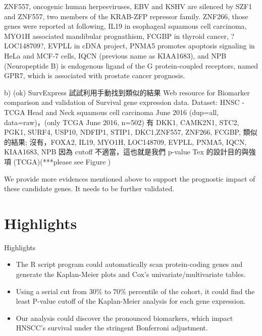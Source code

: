\documentclass[preprint,12pt]{elsarticle}
\begin{document}
ZNF557, oncogenic human herpesviruses, EBV and KSHV are silenced by SZF1 and ZNF557, two members of the KRAB-ZFP repressor family\cite{Li2018c}.
ZNF266, %
those genes were reported at following, 
IL19 in esophageal squamous cell carcinoma\cite{Hsing2013},
MYO1H associated mandibular prognathism\cite{Sun2018}, 
FCGBP in thyroid cancer\cite{Griffith2006}, 
?LOC148709?, 
EVPLL in cDNA project,
PNMA5 promotes apoptosis signaling in HeLa and MCF-7 cells\cite{Lee2016}, 
IQCN (previous name as KIAA1683), and 
NPB (Neuropeptide B) is endogenous ligand of the G protein-coupled receptors, named GPR7\cite{Andreis2005}, which is associated with prostate cancer prognosis\cite{Cottrell2007}. 



b) (ok) SurvExpress
試試利用手動找到類似的結果 Web resource for Biomarker comparison and validation of Survival gene expression data. 
Dataset: HNSC - TCGA Head and Neck squamous cell carcinoma June 2016 (dup=all, data=raw)，(only TCGA June 2016, n=502) \cite{Aguirre-Gamboa2013}
有  DKK1, CAMK2N1, STC2, PGK1, SURF4, USP10, NDFIP1, STIP1, DKC1,ZNF557, ZNF266, FCGBP,  類似的結果;
沒有，FOXA2, IL19, MYO1H, LOC148709, EVPLL, PNMA5, IQCN, KIAA1683, NPB
因為 cutoff 不適當，這也就是我們 p-value Tex 的設計目的與強項
 (TCGA)(***please see Figure \label{fig_SurvExpress})

We provide more evidences mentioned above to support the prognostic impact of these candidate genes. It needs to be further validated.



\section{Highlights}
Highlights
\begin{itemize}
    \item The R script program could automatically scan protein-coding genes and generate the Kaplan-Meier plots and Cox's univariate/multivariate tables.
    \item Using a serial cut from 30\% to 70\% percentile of the cohort, it could find the least P-value cutoff of the Kaplan-Meier analysis for each gene expression.
    \item Our analysis could discover the pronounced biomarkers, which impact HNSCC's survival under the stringent Bonferroni adjustment.
\end{itemize}



%

\end{document}

